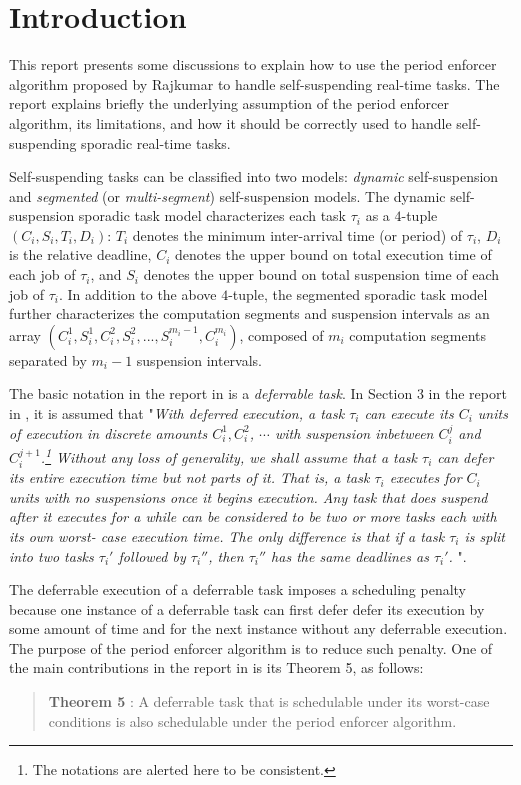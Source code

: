 \section{Introduction} 
This report presents some discussions to explain how to use the period enforcer algorithm proposed by Rajkumar \cite{Raj:suspension1991} to handle self-suspending real-time tasks. The report explains briefly the underlying assumption of the period enforcer algorithm, its limitations, and how it should be correctly used to handle self-suspending sporadic real-time tasks. 

Self-suspending tasks can be classified into two models: \emph{dynamic} self-suspension and \emph{segmented} (or \emph{multi-segment}) self-suspension models. 
The dynamic self-suspension sporadic task model characterizes each
task $\tau_i$ as a $4$-tuple $(C_i,S_i,T_i,D_i)$: $T_i$ denotes the minimum inter-arrival time (or period) of $\tau_i$, $D_i$ is the relative deadline,
$C_i$ denotes the upper bound on total execution time of each job of $\tau_i$,
and $S_i$ denotes the upper bound on total suspension time of each job of $\tau_i$.  In addition to the above $4$-tuple, the segmented sporadic task model further 
characterizes the computation segments and suspension intervals as an array
$(C_{i}^1,S_{i}^1,C_{i}^2,S_{i}^2,...,S_{i}^{m_i-1},C_{i}^{m_i})$, composed of $m_i$ computation segments separated by $m_i-1$ suspension intervals. 

The basic notation in the report in \cite{Raj:suspension1991} is a \emph{deferrable task}. In Section 3 in the report in \cite{Raj:suspension1991}, it is assumed that "\emph{With deferred execution, a task $\tau_i$ can execute its $C_i$ units of execution in discrete amounts $C_i^1, C_i^2$, $\cdots$ with suspension inbetween $C_i^j$ and $C_i^{j+1}$.\footnote{The notations are alerted here to be consistent.} Without any loss of generality, we shall assume that a task $\tau_i$ can defer its entire execution time but not parts of it. That is, a task $\tau_i$ executes for $C_i$ units with no suspensions once it begins execution. Any task that does suspend after it executes for a while can be considered to be two or more tasks each with its own worst- case execution time. The only difference is that if a task $\tau_i$ is split into two tasks $\tau_i'$ followed by $\tau_i''$, then $\tau_i''$ has the same deadlines as $\tau_i′$. }". 

The deferrable execution of a deferrable task imposes a scheduling penalty because one instance of a deferrable task can first defer defer its execution by some amount of time and for the next instance without any deferrable execution. The purpose of the period enforcer algorithm is to reduce such penalty. One of the main contributions in the report in \cite{Raj:suspension1991} is its Theorem 5, as follows:
\begin{quote}
{\bf Theorem 5} \cite{Raj:suspension1991}: A deferrable task that is schedulable under its worst-case conditions is also schedulable under the period enforcer algorithm.
\end{quote}


